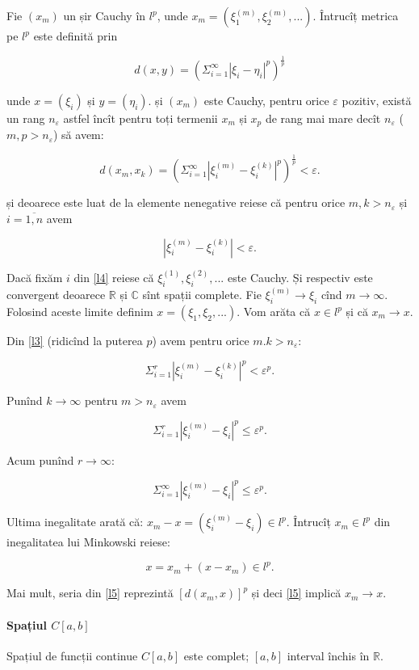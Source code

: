 \documentclass[a4paper,12pt]{article}
\theoremstyle{change}
\newenvironment{proof}[1][Proof]{\begin{trivlist}
\item[\hskip \labelsep {\bfseries #1}]}{\end{trivlist}}
\begin{document}
\begin{proof}
Fie $(x_m)$ un șir Cauchy în $l^p$, unde $x_m=(\xi_1^{(m)},\xi_2^{(m)},...)$. Întrucîț metrica pe $l^p$ este definită prin

\[
  d(x,y) = (\Sigma_{i=1}^\infty |\xi_i - \eta_i|^p)^{\frac{1}{p}}
\]

unde $x=(\xi_i)$ și $y=(\eta_i)$.  și $(x_m)$ este Cauchy, pentru orice $\varepsilon$ pozitiv, există un rang $n_{\varepsilon}$ astfel încît pentru toți termenii $x_m$ și $x_p$ de rang mai mare decît $n_{\varepsilon}$ ($m,p>n_{\varepsilon}$) să avem:

\[
\label{l3}
d(x_m,x_k) = (\Sigma_{i=1}^\infty |\xi_i^{(m)} - \xi_i^{(k)}|^p)^{\frac{1}{p}} < \varepsilon.
\]

și deoarece este luat de la elemente nenegative reiese că pentru orice $m,k>n_\varepsilon$ și $i=\overline{1,n}$ avem

\[
\label{l4}
|\xi_i^{(m)} - \xi_i^{(k)}| < \varepsilon.
\]

Dacă fixăm $i$ din \ref{l4} reiese că $\xi_i^{(1)},\xi_i^{(2)},...$ este Cauchy. Și respectiv este convergent deoarece $\mathbb{R}$ și $\mathbb{C}$ sînt spații complete. Fie $\xi_i^{(m)}\to \xi_i$ cînd $m\to\infty$. Folosind aceste limite definim $x=(\xi_1, \xi_2,...)$. Vom arăta că $x\in l^p$ și că $x_m\to x$.

Din \ref{l3} (ridicînd la puterea $p$) avem pentru orice $m.k>n_\varepsilon$:

\[
\Sigma_{i=1}^r |\xi_i^{(m)} - \xi_i^{(k)}|^p < \varepsilon^p.
\]

Punînd $k\to\infty$ pentru $m>n_\varepsilon$ avem

\[
\Sigma_{i=1}^r |\xi_i^{(m)} - \xi_i|^p \leq \varepsilon^p.
\]

Acum punînd $r\to\infty$:

\[
\label{l5}
\Sigma_{i=1}^\infty |\xi_i^{(m)} - \xi_i|^p \leq \varepsilon^p.
\]

Ultima inegalitate arată că: $x_m-x=(\xi_i^{(m)}-\xi_i)\in l^p$. Întrucîț $x_m\in l^p$ din inegalitatea lui Minkowski reiese:

\[
x=x_m+(x-x_m)\in l^p.
\]

Mai mult, seria din \ref{l5} reprezintă $[d(x_m,x)]^p$ și deci \ref{l5} implică $x_m\to x$.

\end{proof}

\paragraph{Spațiul $C[a,b]$} Spațiul de funcții continue $C[a,b]$ este complet; $[a,b]$ interval închis în $\mathbb{R}$.
\end{document}
